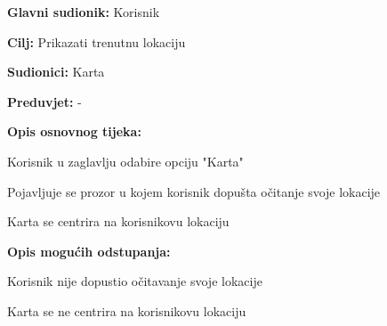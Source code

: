 					\noindent {}
					\begin{packed_item}
	
						\item \textbf{Glavni sudionik: } Korisnik
						\item  \textbf{Cilj:} Prikazati trenutnu lokaciju
						\item  \textbf{Sudionici:} Karta
						\item  \textbf{Preduvjet:} -
						\item  \textbf{Opis osnovnog tijeka:}
						
						\item[] \begin{packed_enum}
	
	                        \item Korisnik u zaglavlju odabire opciju "Karta"
							\item Pojavljuje se prozor u kojem korisnik dopušta očitanje            svoje lokacije
                                \item Karta se centrira na korisnikovu lokaciju

						\end{packed_enum}
						
						\item  \textbf{Opis mogućih odstupanja:}
						
						\item[] \begin{packed_item}
	
							\item[2.a] Korisnik nije dopustio očitavanje svoje lokacije
							\item[] \begin{packed_enum}
								
								\item Karta se ne centrira na korisnikovu lokaciju
								
							\end{packed_enum}
						\end{packed_item}
					\end{packed_item}		
				
